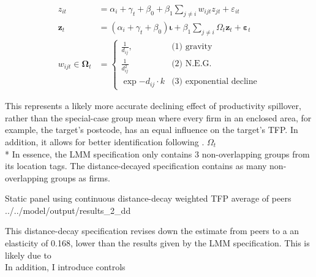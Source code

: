 \begin{align}
    \label{eq:dd-structural1}
    z_{it} &= \alpha_i + \gamma_t + \beta_0
            + \beta_1 \sum_{j\neq i} w_{ijt}z_{jt} + \varepsilon_{it}
    \\
    \mathbf z_{t} &= (\alpha_i + \gamma_t + \beta_0)\boldsymbol\iota
            + \beta_1 \sum_{j\neq i} \Omega_t \mathbf z_{t} + \boldsymbol\varepsilon_{t}
    \\
    w_{ijt}\in \mathbf \Omega_t &=
        \begin{cases}
            \frac1{d_{ij}},         &\text{(1) gravity}                                      \\
            \frac1{d_{ij}^2}        &\text{(2) N.E.G.} \\
            \exp{-d_{ij}\cdot k}    &\text{(3) exponential decline}
        \end{cases}
\end{align}

This represents a likely more accurate declining effect of productivity spillover,
rather than the special-case group mean where every firm in an enclosed area,
for example, the target's postcode, has an equal influence on the target's TFP.
In addition, it allows for better identification following \cite{Bramoulle2009}.
$\Omega_t$
\\*
In essence, the LMM specification only contains 3 non-overlapping groups
from its location tags. The distance-decayed specification
contains as many non-overlapping groups as firms.

\wraptable
    {Static panel using continuous distance-decay weighted TFP average of peers}
    {../../model/output/results_2_dd}
    {}

This distance-decay specification revises down the estimate from peers to a an elasticity of 0.168,
lower than the results given by the LMM specification. This is likely due to 
\\
In addition, I introduce controls 